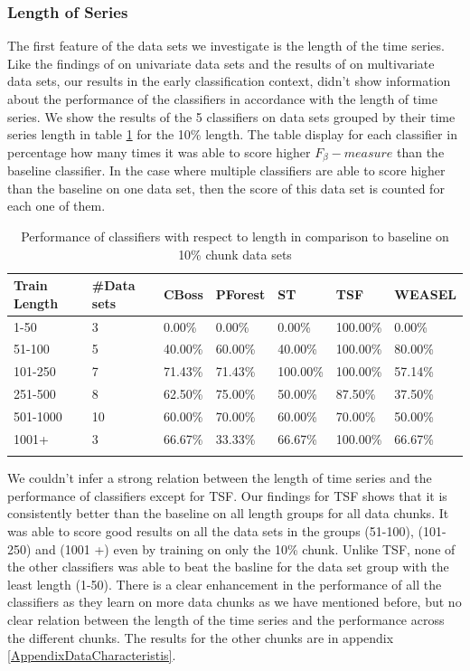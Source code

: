 \subsubsection{Length of Series}
The first feature of the data sets we investigate is the length of the time series.
Like the findings of \cite{bagnall2017great} on univariate data sets and the results of \cite{fawaz2019deepreview} on multivariate data sets,
our results in the early classification context, didn't show information about the performance of the classifiers in accordance with the length of time series.
We show the results of the 5 classifiers on data sets grouped by their time series length in table \ref{TableLength10} for the 10\% length.
The table display for each classifier in percentage how many times it was able to score higher $F_{\beta}-measure$ than the baseline classifier.
In the case where multiple classifiers are able to score higher than the baseline on one data set, then the score of this data set is counted for each one of them.

\begin{table}[hp!]
	\setlength\extrarowheight{2pt} %
	\begin{tabularx}{\textwidth}{|X|X|X|X|X|X|X|}
	\hline
	\textbf{Train Length} & \textbf{\#Data sets} & \textbf{CBoss} & \textbf{PForest} & \textbf{ST} & \textbf{TSF} & \textbf{WEASEL} \\ \hline
		1-50 & 3 & 0.00\% & 0.00\% & 0.00\% & 100.00\% & 0.00\% \\ \hline
		51-100 & 5 & 40.00\% & 60.00\% & 40.00\% & 100.00\% & 80.00\% \\ \hline
		101-250 & 7 & 71.43\% & 71.43\% & 100.00\% & 100.00\% & 57.14\% \\ \hline
		251-500 & 8 & 62.50\% & 75.00\% & 50.00\% & 87.50\% & 37.50\% \\ \hline
		501-1000 & 10 & 60.00\% & 70.00\% & 60.00\% & 70.00\% & 50.00\% \\ \hline
		1001+ & 3 & 66.67\% & 33.33\% & 66.67\% & 100.00\% & 66.67\% \\ \hline
	\caption{Performance of classifiers with respect to length in comparison to baseline on 10\% chunk data sets}
	\label{TableLength10}
  \end{tabularx}
\end{table}

We couldn't infer a strong relation between the length of time series and the performance of classifiers except for TSF. 
Our findings for TSF shows that it is consistently better than the baseline on all length groups for all data chunks.
It was able to score good results on all the data sets in the groups (51-100), (101-250) and (1001 +) even by training on only the 10\% chunk.
Unlike TSF, none of the other classifiers was able to beat the basline for the data set group with the least length (1-50).
There is a clear enhancement in the performance of all the classifiers as they learn on more data chunks as we have mentioned before,
but no clear relation between the length of the time series and the performance across the different chunks.
The results for the other chunks are in appendix \ref{AppendixDataCharacteristis}.

